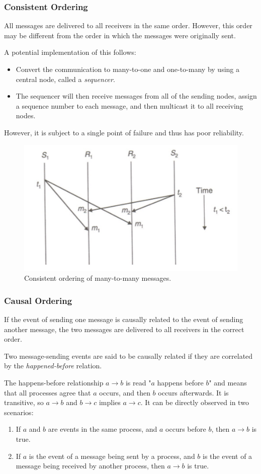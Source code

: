 \subsubsection{Consistent Ordering}
All messages are delivered to all receivers in the same order. However, this order may be different from the order in which the messages were originally sent.

A potential implementation of this follows: \begin{itemize}
\item Convert the communication to many-to-one and one-to-many by using a central node, called a \textit{sequencer}.
\item The sequencer will then receive messages from all of the sending nodes, assign a sequence number to each message, and then multicast it to all receiving nodes.
\end{itemize}

However, it is subject to a single point of failure and thus has poor reliability.

\begin{figure}[h]
\centering
\includegraphics[width=0.7\linewidth]{figures/screenshot021}
\caption{Consistent ordering of many-to-many messages.}
\label{fig:screenshot021}
\end{figure}

\subsubsection{Causal Ordering}
\label{sssec:causalordering}
If the event of sending one message is causally related to the event of sending another message, the two messages are delivered to all receivers in the correct order.

Two message-sending events are said to be causally related if they are correlated by the \textit{happened-before} relation.

The happens-before relationship $a \rightarrow b$ is read "$a$ happens before $b$" and means that all processes agree that $a$ occurs, and then $b$ occurs afterwards. It is transitive, so $a \rightarrow b$ and $b \rightarrow c$ implies $a \rightarrow c$. It can be directly observed in two scenarios: \begin{enumerate}
\item If $a$ and $b$ are events in the same process, and $a$ occurs before $b$, then $a \rightarrow b$ is true.
\item If $a$ is the event of a message being sent by a process, and $b$ is the event of a message being received by another process, then $a \rightarrow b$ is true.
\end{enumerate}


